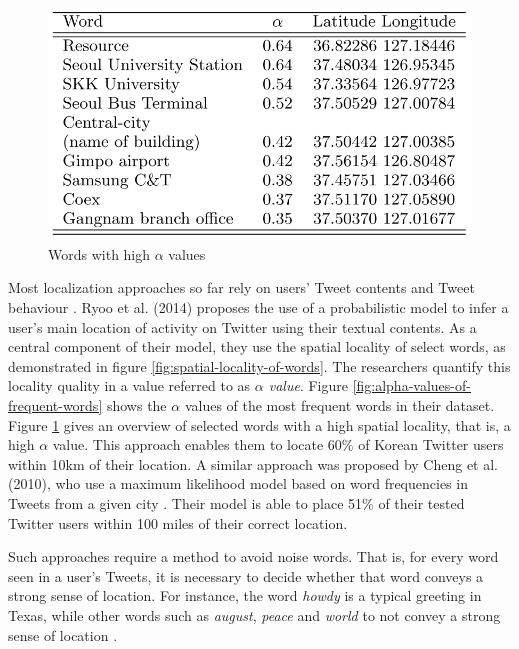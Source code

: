 \documentclass[10pt,a4paper]{article}
\begin{document}
\begin{figure}
	\centering
	\includegraphics[scale=0.60]{words-with-high-alpha-value}
	\caption{Words with high $\alpha$ values \cite{ryoo14a}}
	\label{fig:words-with-high-alpha-value}
\end{figure}

Most localization approaches so far rely on users' Tweet contents and Tweet behaviour \cite{ryoo14a, chen10a, hech11a, chi14a, mahm14a, chan12a, han16a}. Ryoo et al. (2014) \cite{ryoo14a} proposes the use of a probabilistic model to infer a user's main location of activity on Twitter using their textual contents. As a central component of their model, they use the spatial locality of select words, as demonstrated in figure \ref{fig:spatial-locality-of-words}. The researchers quantify this locality quality in a value referred to as \textit{$\alpha$ value}. Figure \ref{fig:alpha-values-of-frequent-words} shows the $\alpha$ values of the most frequent words in their dataset. Figure \ref{fig:words-with-high-alpha-value} gives an overview of selected words with a high spatial locality, that is, a high $\alpha$ value. This approach enables them to locate 60\% of Korean Twitter users within 10km of their location. A similar approach was proposed by Cheng et al. (2010), who use a maximum likelihood model based on word frequencies in Tweets from a given city \cite{chen10a}. Their model is able to place 51\% of their tested Twitter users within 100 miles of their correct location.

Such approaches require a method to avoid noise words. That is, for every word seen in a user's Tweets, it is necessary to decide whether that word conveys a strong sense of location. For instance, the word \textit{howdy} is a typical greeting in Texas, while other words such as \textit{august}, \textit{peace} and \textit{world} to not convey a strong sense of location \cite{chen10a}.
\end{document}
